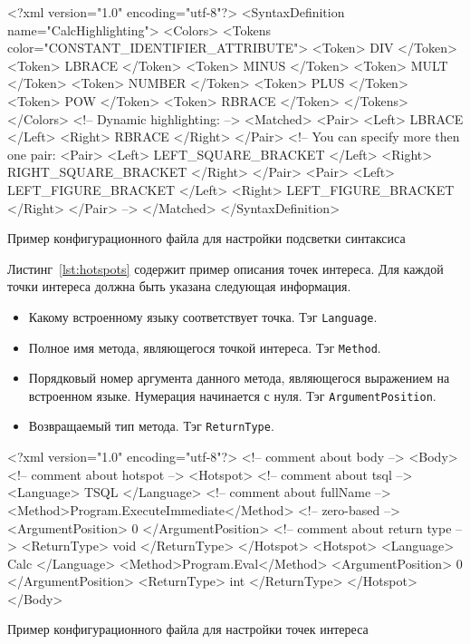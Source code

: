 \begin{listing}[H]
    \begin{pyglist}[language=xml,numbers=left,numbersep=5pt]
<?xml version="1.0" encoding="utf-8"?>
<SyntaxDefinition name="CalcHighlighting">
    <Colors>
        <Tokens color="CONSTANT_IDENTIFIER_ATTRIBUTE">
            <Token> DIV </Token>
            <Token> LBRACE </Token>
            <Token> MINUS </Token>
            <Token> MULT </Token>
            <Token> NUMBER </Token>
            <Token> PLUS </Token>
            <Token> POW </Token>
            <Token> RBRACE </Token>
        </Tokens>
    </Colors>
<!-- Dynamic highlighting: -->
    <Matched>
        <Pair>
            <Left> LBRACE </Left>
            <Right> RBRACE </Right>
        </Pair>
<!-- You can specify more then one pair:        
        <Pair>
            <Left> LEFT_SQUARE_BRACKET </Left>
            <Right> RIGHT_SQUARE_BRACKET </Right>
        </Pair>
        <Pair>
            <Left> LEFT_FIGURE_BRACKET </Left>
            <Right> LEFT_FIGURE_BRACKET </Right>
        </Pair>
-->        
    </Matched>
</SyntaxDefinition>
    \end{pyglist}
\caption{Пример конфигурационного файла для настройки подсветки синтаксиса}
\label{lst:codeHighlighting}
\end{listing}

Листинг~\ref{lst:hotspots} содержит пример описания точек интереса. Для каждой точки интереса должна быть указана следующая информация.
\begin{itemize}
    \item Какому встроенному языку соответствует точка. Тэг \verb|Language|.
    \item Полное имя метода, являющегося точкой интереса. Тэг \verb|Method|.
    \item Порядковый номер аргумента данного метода, являющегося выражением на встроенном языке. Нумерация начинается с нуля. Тэг \verb|ArgumentPosition|. 
    \item Возвращаемый тип метода.  Тэг \verb|ReturnType|. 
\end{itemize}

\begin{listing}[H]
    \begin{pyglist}[language=xml,numbers=left,numbersep=5pt]
<?xml version="1.0" encoding="utf-8"?>
<!-- comment about body -->
<Body>
    <!-- comment about hotspot -->
  <Hotspot>
      <!-- comment about tsql -->
      <Language> TSQL </Language>
      <!-- comment about fullName -->
      <Method>Program.ExecuteImmediate</Method>
      <!-- zero-based -->
      <ArgumentPosition> 0 </ArgumentPosition>
      <!-- comment about return type -->
      <ReturnType> void </ReturnType>
  </Hotspot>
  <Hotspot>
      <Language> Calc </Language>
      <Method>Program.Eval</Method>
      <ArgumentPosition> 0 </ArgumentPosition>
      <ReturnType> int </ReturnType>
  </Hotspot>
</Body>
    \end{pyglist}
\caption{Пример конфигурационного файла для настройки точек интереса}
\label{lst:hotspots}
\end{listing}

